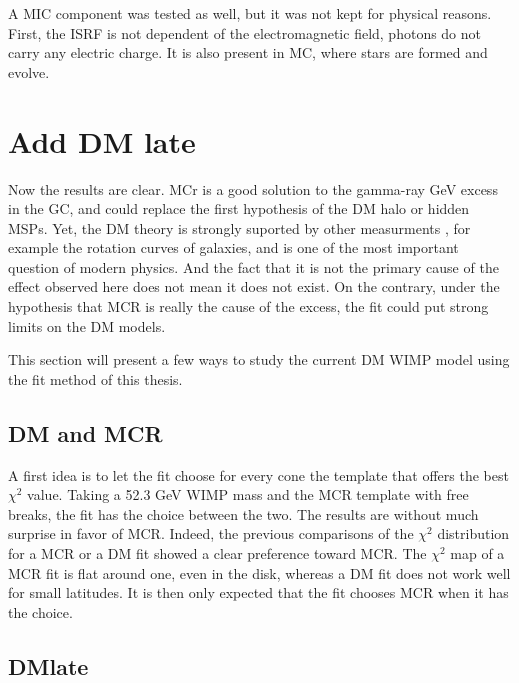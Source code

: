 A MIC component was tested as well, but it was not kept for physical reasons. First, the ISRF is not dependent of the electromagnetic field, photons do not carry any electric charge. It is also present in MC, where stars are formed and evolve.


\section{Add DM late}


Now the results are clear. MCr is a good solution to the gamma-ray GeV excess in the GC, and could replace the first hypothesis of the DM halo or hidden MSPs. Yet, the DM theory is strongly suported by other measurments , for example the rotation curves of galaxies, and is one of the most important question of modern physics. And the fact that it is not the primary cause of the effect observed here does not mean it does not exist. On the contrary, under the hypothesis that MCR is really the cause of the excess, the fit could put strong limits on the DM models.

This section will present a few ways to study the current DM WIMP model using the fit method of this thesis.

\subsection{DM and MCR}


A first idea is to let the fit choose for every cone the template that offers the best $\chi^2$ value. Taking a 52.3 GeV WIMP mass and the MCR template with free breaks, the fit has the choice between the two. The results are without much surprise in favor of MCR. Indeed, the previous comparisons of the $\chi^2$ distribution for a MCR or a DM fit showed a clear preference toward MCR. The $\chi^2$ map of a MCR fit is flat around one, even in the disk, whereas a DM fit does not work well for small latitudes. It is then only expected that the fit chooses MCR when it has the choice.

\subsection{DMlate}


